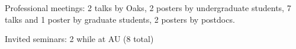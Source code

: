 \begin{veryTightItemize}
    \item Professional meetings: 2 talks by Oaks,
        2 posters by undergraduate students,
        7 talks and 1 poster by graduate students,
        2 posters by postdocs.
    \item Invited seminars: 2 while at AU (8 total)
\end{veryTightItemize}
